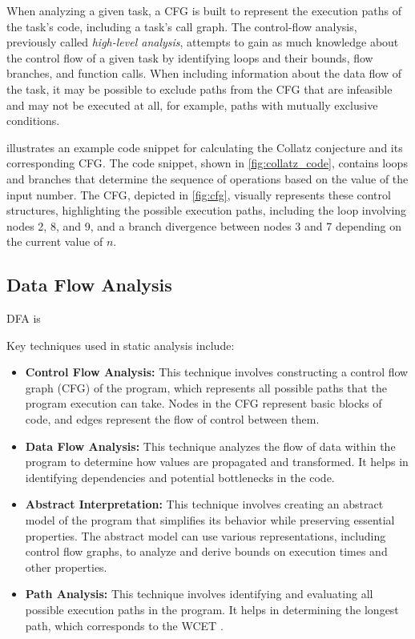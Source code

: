 When analyzing a given task, a \ac{CFG} is built to represent the execution paths of the task's code, including a task's call graph. The control-flow analysis, previously called \textit{high-level analysis}, attempts to gain as much knowledge about the control flow of a given task by identifying loops and their bounds, flow branches, and function calls. When including information about the data flow of the task, it may be possible to exclude paths from the \ac{CFG} that are infeasible and may not be executed at all, for example, paths with mutually exclusive conditions. 

 illustrates an example code snippet for calculating the Collatz conjecture and its corresponding \ac{CFG}. The code snippet, shown in \cref{fig:collatz_code}, contains loops and branches that determine the sequence of operations based on the value of the input number. The \ac{CFG}, depicted in \cref{fig:cfg}, visually represents these control structures, highlighting the possible execution paths, including the loop involving nodes 2, 8, and 9, and a branch divergence between nodes 3 and 7 depending on the current value of $n$.


\subsection{Data Flow Analysis}
\label{sec:dfa}
\ac{DFA} is 

Key techniques used in static analysis include:
\begin{itemize}
	\item \textbf{Control Flow Analysis:} This technique involves constructing a control flow graph (CFG) of the program, which represents all possible paths that the program execution can take. Nodes in the CFG represent basic blocks of code, and edges represent the flow of control between them.
	\item \textbf{Data Flow Analysis:} This technique analyzes the flow of data within the program to determine how values are propagated and transformed. It helps in identifying dependencies and potential bottlenecks in the code.
	\item \textbf{Abstract Interpretation:} This technique involves creating an abstract model of the program that simplifies its behavior while preserving essential properties. The abstract model can use various representations, including control flow graphs, to analyze and derive bounds on execution times and other properties.
	\item \textbf{Path Analysis:} This technique involves identifying and evaluating all possible execution paths in the program. It helps in determining the longest path, which corresponds to the WCET
	.
\end{itemize}

